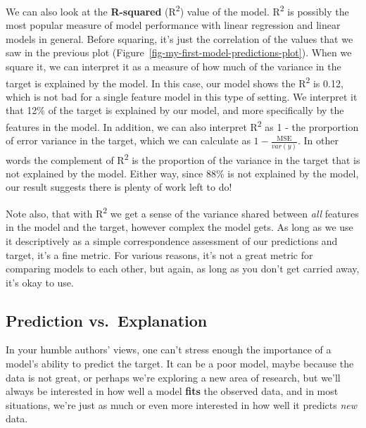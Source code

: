 \documentclass[
  letterpaper,
]{krantz}
\begin{document}
We can also look at the \textbf{R-squared} (R\textsuperscript{2}) value
of the model. R\textsuperscript{2} is possibly the most popular measure
of model performance with linear regression and linear models in
general. Before squaring, it's just the correlation of the values that
we saw in the previous plot
(Figure~\ref{fig-my-first-model-predictions-plot}). When we square it,
we can interpret it as a measure of how much of the variance in the
target is explained by the model. In this case, our model shows the
R\textsuperscript{2} is 0.12, which is not bad for a single feature
model in this type of setting. We interpret it that 12\% of the target
is explained by our model, and more specifically by the features in the
model. In addition, we can also interpret R\textsuperscript{2} as 1 -
the prorportion of error variance in the target, which we can calculate
as \(1 - \frac{\textrm{MSE}}{var(y)}\). In other words the complement of
R\textsuperscript{2} is the proportion of the variance in the target
that is not explained by the model. Either way, since 88\% is not
explained by the model, our result suggests there is plenty of work left
to do!

Note also, that with R\textsuperscript{2} we get a sense of the variance
shared between \emph{all} features in the model and the target, however
complex the model gets. As long as we use it descriptively as a simple
correspondence assessment of our predictions and target, it's a fine
metric. For various reasons, it's not a great metric for comparing
models to each other, but again, as long as you don't get carried away,
it's okay to use.

\subsection{Prediction
vs.~Explanation}\label{sec-lm-prediction-vs-explanation}

In your humble authors' views, one can't stress enough the importance of
a model's ability to predict the target. It can be a poor model, maybe
because the data is not great, or perhaps we're exploring a new area of
research, but we'll always be interested in how well a model
\textbf{fits} the observed data, and in most situations, we're just as
much or even more interested in how well it predicts \emph{new} data.
\end{document}
